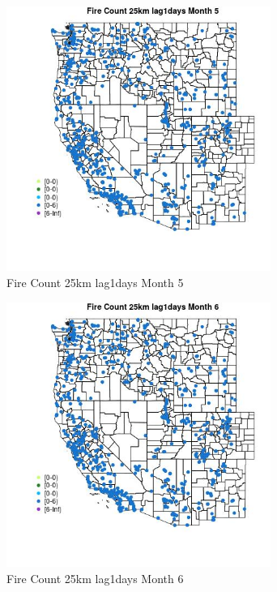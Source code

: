 \begin{figure} 
\centering  
\includegraphics[width=0.77\textwidth]{Code_Outputs/Report_ML_input_PM25_Step4_part_e_de_duplicated_aves_compiled_2019-05-21wNAs_MapObsMo5Fire_Count_25km_lag1days.jpg} 
\caption{\label{fig:Report_ML_input_PM25_Step4_part_e_de_duplicated_aves_compiled_2019-05-21wNAsMapObsMo5Fire_Count_25km_lag1days}Fire Count 25km lag1days Month 5} 
\end{figure} 
 

\begin{figure} 
\centering  
\includegraphics[width=0.77\textwidth]{Code_Outputs/Report_ML_input_PM25_Step4_part_e_de_duplicated_aves_compiled_2019-05-21wNAs_MapObsMo6Fire_Count_25km_lag1days.jpg} 
\caption{\label{fig:Report_ML_input_PM25_Step4_part_e_de_duplicated_aves_compiled_2019-05-21wNAsMapObsMo6Fire_Count_25km_lag1days}Fire Count 25km lag1days Month 6} 
\end{figure} 
 

